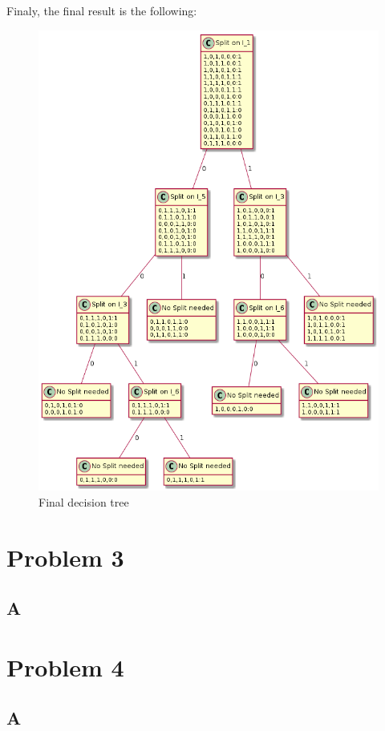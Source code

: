 \documentclass{article}
\begin{document}
            Finaly, the final result is the following:
            \begin{figure}[H]
                \centering
                \includegraphics[scale=0.5]{problem2/graph.png}
                \caption{Final decision tree}
                \label{Final decision tree}
            \end{figure}


    \section{Problem 3}
        \subsection{A}
    \section{Problem 4}
        \subsection{A}
\end{document}
